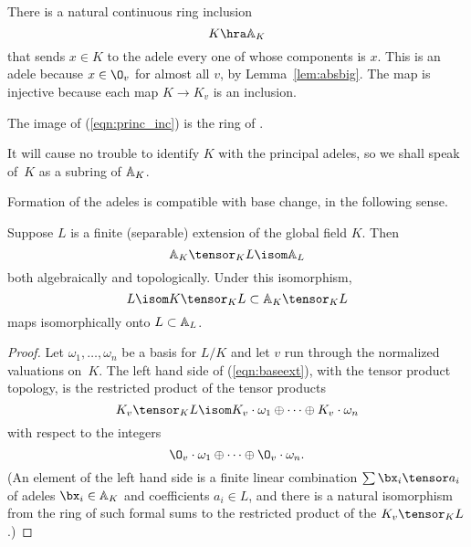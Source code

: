 \documentclass[11pt]{book}
\begin{document}
\begin{ch}
There is a natural continuous ring inclusion
\begin{equation}\label{eqn:princ_inc}
K\hra \AA_K
\end{equation}
that sends $x\in K$ to the adele every one of whose components is $x$.
This is an adele because $x\in \O_v$ for almost all $v$, by
Lemma~\ref{lem:absbig}.  The map is injective because each map $K\to
K_v$ is an inclusion.

\begin{definition}
  The image of (\ref{eqn:princ_inc}) is the ring of .
\end{definition}
It will cause no trouble to identify $K$ with the principal adeles, so
we shall speak of~$K$ as a subring of $\AA_K$.

Formation of the adeles is compatible with base change, in the
following sense.
\begin{lemma}\label{lem:adelext}
  Suppose $L$ is a finite (separable) extension of the global field
  $K$.  Then
\begin{equation}\label{eqn:baseext}
  \AA_K \tensor_K L \isom \AA_L
\end{equation}
both algebraically and topologically.  Under this isomorphism,
  $$L\isom K\tensor_K L \subset \AA_K \tensor_K L$$ maps isomorphically onto
  $L\subset \AA_L$.
\end{lemma}
\begin{proof}
Let $\omega_1,\ldots, \omega_n$
be a basis for $L/K$ and let $v$ run through the normalized valuations
on~$K$.  The left hand side of (\ref{eqn:baseext}), with
the tensor product topology, is the restricted product of the
tensor products
$$
  K_v \tensor_K L \isom K_v \cdot\omega_1 \oplus \cdots \oplus K_v\cdot \omega_n
$$
with respect to the integers
\begin{equation}\label{eqn:intsum}
   \O_v\cdot \omega_1 \oplus \cdots \oplus \O_v\cdot \omega_n.
 \end{equation}
 (An element of the left hand side is a finite linear combination $\sum
\bx_i \tensor a_i$ of adeles $\bx_i \in \AA_K$ and coefficients $a_i
\in L$, and there is a natural isomorphism from the ring of such formal
sums to the restricted product of the $K_v\tensor_K L$.)


\end{proof}
\end{ch}
\end{document}
